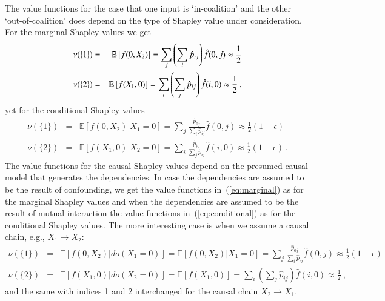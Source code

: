 \documentclass{article}
\newcommand{\expectation}{\mathbb{E}}
\newcommand{\dodo}{\mathit{do}}
\begin{document}
The value functions for the case that one input is `in-coalition' and the other `out-of-coalition' does depend on the type of Shapley value under consideration. For the marginal Shapley values we get
\begin{eqnarray}
\nu(\{1\}) & = & \expectation\left[f(0,X_2)\right] = \sum_{j} \left(\sum_i \hat{p}_{ij}\right) \hat{f}(0,j) \nonumber \approx {1 \over 2} \\
\nu(\{2\}) & = & \expectation\left[f(X_1,0)\right] = \sum_{i} \left(\sum_j \hat{p}_{ij}\right) \hat{f}(i,0) \approx \frac{1}{2} \: ,
\label{eq:marginal}
\end{eqnarray}
yet for the conditional Shapley values
\begin{eqnarray}
\nu(\{1\}) & = & \expectation\left[f(0,X_2)|X_1=0\right] = \sum_{j} \frac{\hat{p}_{0j}}{\sum_{i} \hat{p}_{ij}} \hat{f}(0,j) \approx \frac{1}{2}(1-\epsilon) \nonumber \\
\nu(\{2\}) & = & \expectation\left[f(X_1,0)|X_2=0\right] = \sum_{i} \frac{\hat{p}_{i0}}{\sum_{j} \hat{p}_{ij}} \hat{f}(i,0) \approx \frac{1}{2}(1-\epsilon) \: .
\label{eq:conditional}
\end{eqnarray}
The value functions for the causal Shapley values depend on the presumed causal model that generates the dependencies. In case the dependencies are assumed to be the result of confounding, we get the value functions in~(\ref{eq:marginal}) as for the marginal Shapley values and when the dependencies are assumed to be the result of mutual interaction the value functions in~(\ref{eq:conditional}) as for the conditional Shapley values. The more interesting case is when we assume a causal chain, e.g., $X_1 \rightarrow X_2$:
\begin{eqnarray}
\nu(\{1\}) & = & \expectation\left[f(0,X_2)|\dodo(X_1=0)\right] = \expectation\left[f(0,X_2)|X_1=0\right] = \sum_{j} \frac{\hat{p}_{0j}}{\sum_{i} \hat{p}_{ij}} \hat{f}(0,j) \approx \frac{1}{2}(1-\epsilon) \nonumber \\
\nu(\{2\}) & = & \expectation\left[f(X_1,0)|\dodo(X_2=0)\right] =\expectation\left[f(X_1,0)\right] = \sum_{i} \left(\sum_j \hat{p}_{ij}\right) \hat{f}(i,0) \approx \frac{1}{2} \: ,
\label{eq:causal}
\end{eqnarray}
and the same with indices 1 and 2 interchanged for the causal chain $X_2 \rightarrow X_1$.
\end{document}
